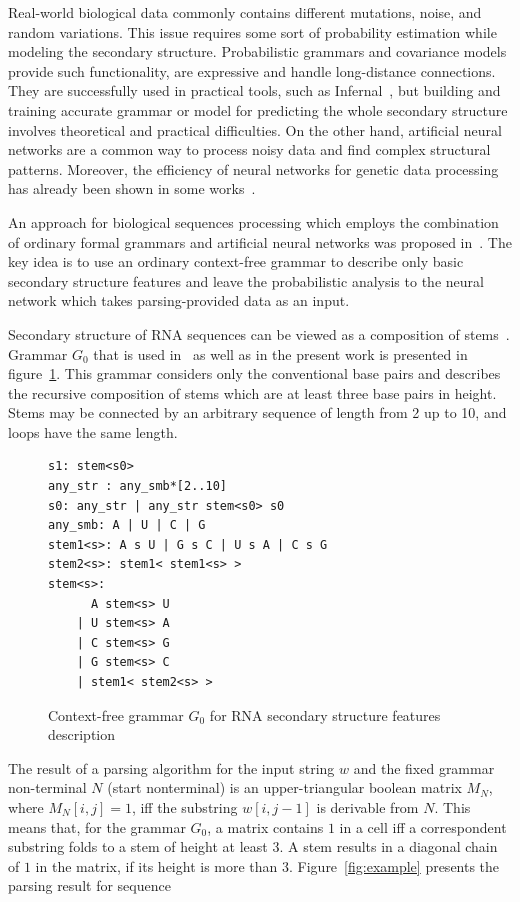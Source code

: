 \documentclass[runningheads]{llncs}
\begin{document}
Real-world biological data commonly contains different mutations, noise, and random variations.
This issue requires some sort of probability estimation while modeling the secondary structure.
Probabilistic grammars and covariance models provide such functionality, are expressive and handle long-distance connections.
They are successfully used in practical tools, such as Infernal~\cite{Infernal}, but building and training accurate grammar or model for predicting the whole secondary structure involves theoretical and practical difficulties.
On the other hand, artificial neural networks are a common way to process noisy data and find complex structural patterns.
Moreover, the efficiency of neural networks for genetic data processing has already been shown in some works~\cite{Humidor,ANN}.

An approach for biological sequences processing which employs the combination of ordinary formal grammars and artificial neural networks was proposed in~\cite{grigorevcomposition}.  
The key idea is to use an ordinary context-free grammar to describe only basic secondary structure features and leave the probabilistic analysis to the neural network which takes parsing-provided data as an input.

Secondary structure of RNA sequences can be viewed as a composition of stems~\cite{MQbioinformatics19}.
Grammar $G_0$ that is used in~\cite{grigorevcomposition} as well as in the present work is presented in figure~\ref{gram}.
This grammar considers only the conventional base pairs and describes the recursive composition of stems which are at least three base pairs in height. Stems may be connected by an arbitrary sequence of length from 2 up to 10, and loops have the same length.

\begin{figure}
\begin{verbatim}
s1: stem<s0>
any_str : any_smb*[2..10]
s0: any_str | any_str stem<s0> s0
any_smb: A | U | C | G
stem1<s>: A s U | G s C | U s A | C s G 
stem2<s>: stem1< stem1<s> >
stem<s>:  
      A stem<s> U 
    | U stem<s> A 
    | C stem<s> G 
    | G stem<s> C 
    | stem1< stem2<s> >  
\end{verbatim}
\caption{Context-free grammar $G_0$ for RNA secondary structure features description}
\label{gram}
\end{figure}

The result of a parsing algorithm for the input string $w$ and the fixed grammar non-terminal $N$ (start nonterminal) is an upper-triangular boolean matrix $M_N$, where $M_N [i,j] = 1$, iff the substring $w[i,j-1]$ is derivable from $N$.
This means that, for the grammar $G_0$, a matrix contains $1$ in a cell iff a correspondent substring folds to a  stem of height at least 3.
A stem results in a diagonal chain of $1$ in the matrix, if its height is more than 3.
Figure~\ref{fig:example} presents the parsing result for sequence
\end{document}
